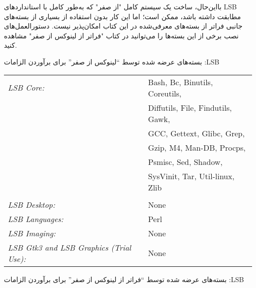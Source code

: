 \documentclass{book}
\begin{document}
\par
بااین‌حال، ساخت یک سیستم کامل "از صفر" که به‌طور کامل با استانداردهای LSB مطابقت داشته باشد، ممکن است؛ اما این کار بدون استفاده از بسیاری از بسته‌های جانبی فراتر از بسته‌های معرفی‌شده در این کتاب امکان‌پذیر نیست. دستورالعمل‌های نصب برخی از این بسته‌ها را می‌توانید در کتاب "فراتر از لینوکس از صفر" مشاهده کنید.
\newline

\begin{flushright}
بسته‌های عرضه شده توسط “لینوکس از صفر” برای برآوردن الزامات :LSB
\end{flushright}

\begin{LTR} 

	\vspace{0.1cm}

	\begin{tabular}{@{} l l @{}}
		\textit{LSB Core:} & Bash, Bc, Binutils, Coreutils, \\ 
					&Diffutils, File, Findutils, Gawk, \\
					& GCC, Gettext, Glibc, Grep, \\ 
					&Gzip, M4, Man-DB, Procps, \\
					& Psmisc, Sed, Shadow, \\ 
					&SysVinit, Tar, Util-linux, Zlib \\
					\\
		\textit{LSB Desktop:} & None \\
		\textit{LSB Languages:} & Perl \\
		\textit{LSB Imaging:} & None \\
		\textit{LSB Gtk3 and LSB Graphics (Trial Use):} & None \\
	\end{tabular}

\end{LTR}

\newpage

\begin{flushright}
بسته‌های عرضه شده توسط “فراتر از لینوکس از صفر” برای برآوردن الزامات :LSB
\end{flushright}
\end{document}

